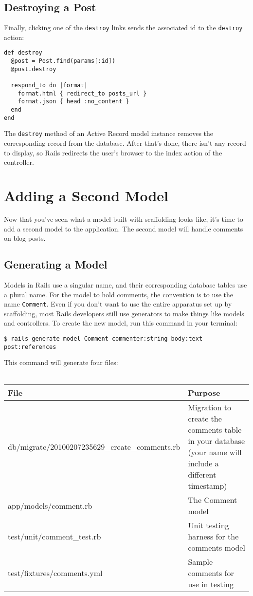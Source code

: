 \documentclass[10pt]{book}
\begin{document}
\subsection{ Destroying a Post}

Finally, clicking one of the \texttt{destroy} links sends the associated id to the \texttt{destroy} action:


\begin{verbatim}
def destroy
  @post = Post.find(params[:id])
  @post.destroy
 
  respond_to do |format|
    format.html { redirect_to posts_url }
    format.json { head :no_content }
  end
end
\end{verbatim}

The \texttt{destroy} method of an Active Record model instance removes the corresponding record from the database. After that’s done, there isn’t any record to display, so Rails redirects the user’s browser to the index action of the controller.

\section{ Adding a Second Model}

Now that you’ve seen what a model built with scaffolding looks like, it’s time to add a second model to the application. The second model will handle comments on blog posts.

\subsection{ Generating a Model}

Models in Rails use a singular name, and their corresponding database tables use a plural name. For the model to hold comments, the convention is to use the name \texttt{Comment}. Even if you don’t want to use the entire apparatus set up by scaffolding, most Rails developers still use generators to make things like models and controllers. To create the new model, run this command in your terminal:


\begin{verbatim}
$ rails generate model Comment commenter:string body:text post:references
\end{verbatim}

This command will generate four files:
\\ \\
\begin{tabular}{p{}p{}}
\hline
\textbf{File} & \textbf{Purpose} \\ 
\hline
db/migrate/20100207235629\_create\_comments.rb  &  Migration to create the comments table in your database (your name will include a different timestamp)  \\ 
 app/models/comment.rb                        &  The Comment model  \\ 
 test/unit/comment\_test.rb                    &  Unit testing harness for the comments model  \\ 
 test/fixtures/comments.yml                   &  Sample comments for use in testing 
\end{tabular}
\\ \\
\end{document}
